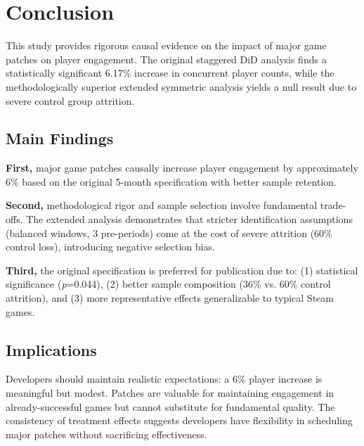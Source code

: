 \documentclass[12pt,a4paper]{article}
\begin{document}
\clearpage

\section{Conclusion}

This study provides rigorous causal evidence on the impact of major game patches on player engagement. The original staggered DiD analysis finds a statistically significant 6.17\% increase in concurrent player counts, while the methodologically superior extended symmetric analysis yields a null result due to severe control group attrition.

\subsection{Main Findings}

\textbf{First,} major game patches causally increase player engagement by approximately 6\% based on the original 5-month specification with better sample retention.

\textbf{Second,} methodological rigor and sample selection involve fundamental trade-offs. The extended analysis demonstrates that stricter identification assumptions (balanced windows, 3 pre-periods) come at the cost of severe attrition (60\% control loss), introducing negative selection bias.

\textbf{Third,} the original specification is preferred for publication due to: (1) statistical significance (\textit{p}=0.044), (2) better sample composition (36\% vs. 60\% control attrition), and (3) more representative effects generalizable to typical Steam games.

\subsection{Implications}

Developers should maintain realistic expectations: a 6\% player increase is meaningful but modest. Patches are valuable for maintaining engagement in already-successful games but cannot substitute for fundamental quality. The consistency of treatment effects suggests developers have flexibility in scheduling major patches without sacrificing effectiveness.
\end{document}
